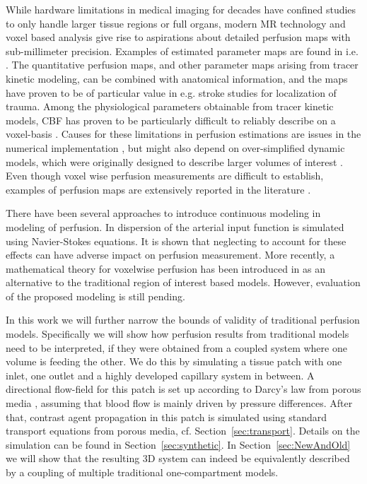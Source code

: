 \documentclass[journal,twocolumn]{IEEEtran}
\begin{document}
	While hardware limitations in medical imaging for decades have confined studies to only handle larger tissue regions or full organs, modern MR technology and voxel based analysis give rise to aspirations about detailed perfusion maps with sub-millimeter precision.  
	Examples of estimated parameter maps are found in i.e. \cite{Feng2013,Chen2011}. 
	The quantitative perfusion maps, and other parameter maps arising from tracer kinetic modeling, can be combined with anatomical information, and the maps have proven to be of particular value in e.g. stroke studies for localization of trauma. 
	Among the physiological parameters obtainable from tracer kinetic models, CBF has proven to be particularly difficult to reliably describe on a voxel-basis \cite{kudo10}.
	Causes for these limitations in perfusion estimations are issues in the numerical implementation \cite{kudo10}, but might also depend on over-simplified dynamic models, which were originally designed to describe larger volumes of interest \cite{zierler00}.	
 	Even though voxel wise perfusion measurements are difficult to establish, examples of perfusion maps are extensively reported in the literature \cite{Feng2013,Chen2011}.
	
	There have been several approaches to introduce continuous modeling in modeling of perfusion.
	In \cite{calamante03} dispersion of the arterial input function is simulated using Navier-Stokes equations.
	It is shown that neglecting to account for these effects can have adverse impact on perfusion measurement.
	More recently, a mathematical theory for voxelwise perfusion has been introduced in \cite{sourbron14} as an alternative to the traditional region of interest based models.
	However, evaluation of the proposed modeling is still pending.
	
	In this work we will further narrow the bounds of validity of traditional perfusion models.
	Specifically we will show how perfusion results from traditional models need to be interpreted, if they were obtained from a coupled system where one volume is feeding the other.
	We do this by simulating a tissue patch with one inlet, one outlet and a highly developed capillary system in between.
	A directional flow-field for this patch is set up according to Darcy's law from porous media \cite{Darcy56}, assuming that blood flow is mainly driven by pressure differences.	
	After that, contrast agent propagation in this patch is simulated using standard transport equations from porous media, cf. Section~\ref{sec:transport}.
	Details on the simulation can be found in Section~\ref{sec:synthetic}.	
	In Section~\ref{sec:NewAndOld} we will show that the resulting 3D system can indeed be equivalently described by a coupling of multiple traditional one-compartment models.
\end{document}
